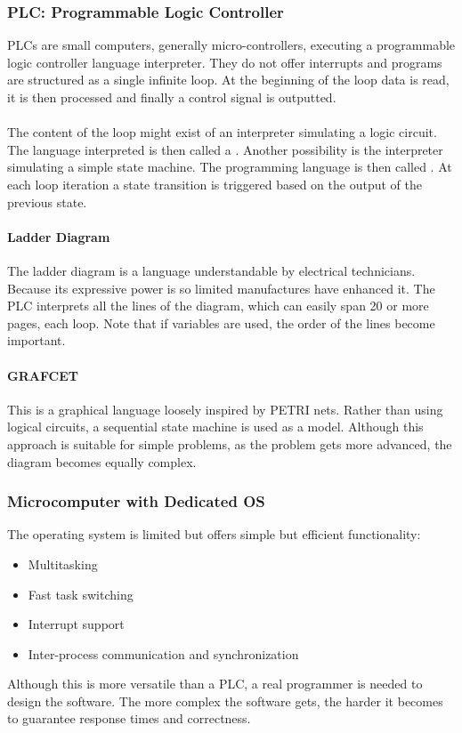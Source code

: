 \documentclass[../main.tex]{subfiles}
\begin{document}
\subsubsection{PLC: Programmable Logic Controller}
PLCs are small computers, generally micro-controllers, executing a programmable logic controller language interpreter. They do not offer interrupts and programs are structured as a single infinite loop. At the beginning of the loop data is read, it is then processed and finally a control signal is outputted.
\\\\
The content of the loop might exist of an interpreter simulating a logic circuit. The language interpreted is then called a . Another possibility is the interpreter simulating a simple state machine. The programming language is then called . At each loop iteration a state transition is triggered based on the output of the previous state.

\paragraph{Ladder Diagram} 
The ladder diagram is a language understandable by electrical technicians. Because its expressive power is so limited manufactures have enhanced it. The PLC interprets all the lines of the diagram, which can easily span 20 or more pages, each loop. Note that if variables are used, the order of the lines become important.  

\paragraph{GRAFCET} This is a graphical language loosely inspired by PETRI nets. Rather than using logical circuits, a sequential state machine is used as a model. Although this approach is suitable for simple problems, as the problem gets more advanced, the diagram becomes equally complex.

\subsubsection{Microcomputer with Dedicated OS}
The operating system is limited but offers simple but efficient functionality:
\begin{itemize}
	\item Multitasking
	\item Fast task switching
	\item Interrupt support
	\item Inter-process communication and synchronization
\end{itemize}
Although this is more versatile than a PLC, a real programmer is needed to design the software. The more complex the software gets, the harder it becomes to guarantee response times and correctness.
\end{document}
